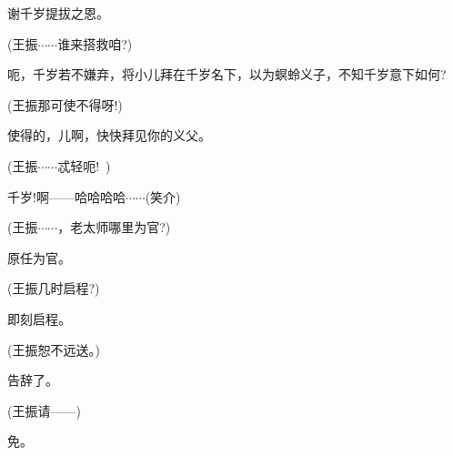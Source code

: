 {{谢千岁提拔之恩。}

{(王振\hspace{30pt}$\cdots{}\cdots{}$谁来搭救咱?)}

{呃，千岁若不嫌弃，将小儿拜在千岁名下，以为螟蛉义子，不知千岁意下如何?}

{(王振\hspace{30pt}那可使不得呀!)}

{使得的，儿啊，快快拜见你的义父。}

{(王振\hspace{30pt}$\cdots{}\cdots{}$忒轻{\footnotesize 呃}!~)}

{千岁!啊------哈哈哈哈$\cdots{}\cdots{}$({\hwfs 笑介})}

{(王振\hspace{30pt}$\cdots{}\cdots{}$，老太师哪里为官?)}

{原任为官。}

{(王振\hspace{30pt}几时启程?)}

{即刻启程。}

{(王振\hspace{30pt}恕不远送。)}

{告辞了。}

{(王振\hspace{30pt}请------)}

{免。}

}
